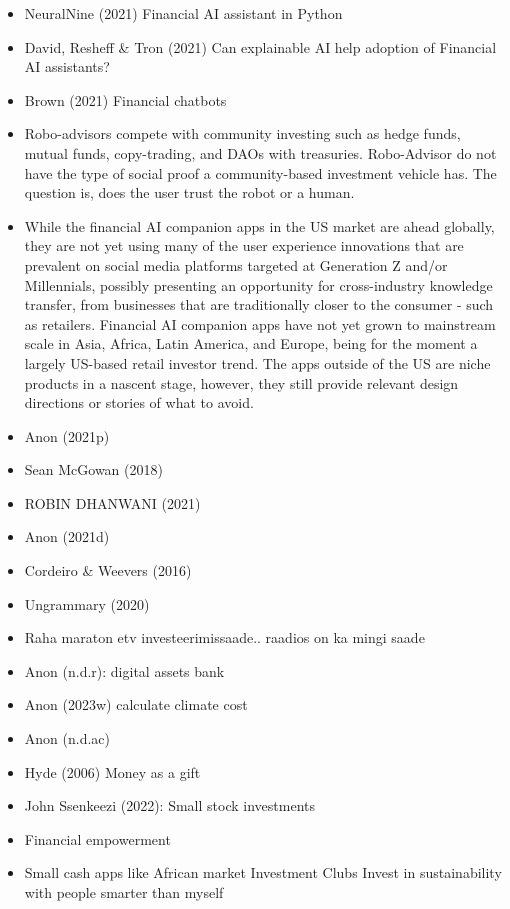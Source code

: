 \documentclass[
  letterpaper,
  DIV=11,
  numbers=noendperiod]{scrartcl}
\begin{document}
\begin{itemize}
\item
  NeuralNine (2021) Financial AI assistant in Python
\item
  David, Resheff \& Tron (2021) Can explainable AI help adoption of
  Financial AI assistants?
\item
  Brown (2021) Financial chatbots
\item
  Robo-advisors compete with community investing such as hedge funds,
  mutual funds, copy-trading, and DAOs with treasuries. Robo-Advisor do
  not have the type of social proof a community-based investment vehicle
  has. The question is, does the user trust the robot or a human.
\item
  While the financial AI companion apps in the US market are ahead
  globally, they are not yet using many of the user experience
  innovations that are prevalent on social media platforms targeted at
  Generation Z and/or Millennials, possibly presenting an opportunity
  for cross-industry knowledge transfer, from businesses that are
  traditionally closer to the consumer - such as retailers. Financial AI
  companion apps have not yet grown to mainstream scale in Asia, Africa,
  Latin America, and Europe, being for the moment a largely US-based
  retail investor trend. The apps outside of the US are niche products
  in a nascent stage, however, they still provide relevant design
  directions or stories of what to avoid.
\item
  Anon (2021p)
\item
  Sean McGowan (2018)
\item
  ROBIN DHANWANI (2021)
\item
  Anon (2021d)
\item
  Cordeiro \& Weevers (2016)
\item
  Ungrammary (2020)
\item
  Raha maraton etv investeerimissaade.. raadios on ka mingi saade
\item
  Anon (n.d.r): digital assets bank
\item
  Anon (2023w) calculate climate cost
\item
  Anon (n.d.ac)
\item
  Hyde (2006) Money as a gift
\item
  John Ssenkeezi (2022): Small stock investments
\item
  Financial empowerment
\item
  Small cash apps like African market Investment Clubs Invest in
  sustainability with people smarter than myself

\end{itemize}
\end{document}
